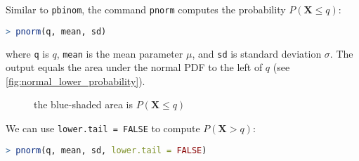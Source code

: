 Similar to \verb|pbinom|, the command \verb|pnorm| computes the probability \( P(\bm{X} \leq q) \):
\begin{lstlisting}[language=R]
> pnorm(q, mean, sd)
\end{lstlisting}
where \verb|q| is \( q \), \verb|mean| is the mean parameter \( \mu \), and \verb|sd| is standard deviation \( \sigma \).
The output equals the area under the normal PDF to the left of \( q \) (see \autoref{fig:normal_lower_probability}).
\begin{figure}[t]
\begin{center}
\end{center}
\caption{the blue-shaded area is \( P(\bm{X} \leq q) \)}
\label{fig:normal_lower_probability}
\end{figure}

We can use \verb|lower.tail = FALSE| to compute \( P(\bm{X} > q) \):
\begin{lstlisting}[language=R]
> pnorm(q, mean, sd, lower.tail = FALSE)
\end{lstlisting}

